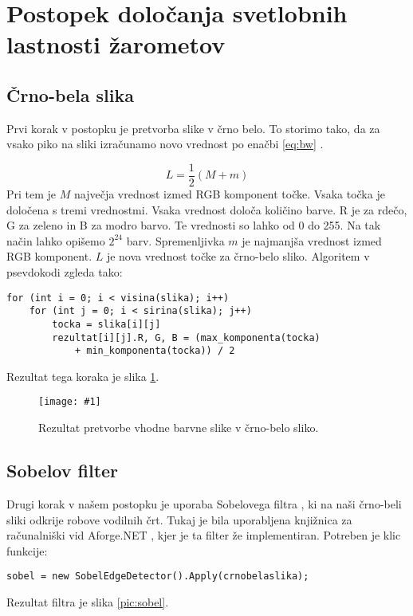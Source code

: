\documentclass[oneside, a4paper, 12pt]{book}
\newcommand{\slika}[3]{
	\begin{figure}
	\begin{center}
	\texttt{[image: \#1]}
	\end{center}
	\vspace{-20pt}
	\caption{#2}
	\label{#3}
	\end{figure}
}
\begin{document}
\section{Postopek določanja svetlobnih lastnosti žarometov}
\subsection{Črno-bela slika}
Prvi korak v postopku je pretvorba slike v črno belo. To storimo tako, da za vsako piko na sliki izračunamo novo vrednost po enačbi \ref{eq:bw} \cite{LHS}.

\begin{equation}
L=\dfrac{1}{2}(M+m)
\label{eq:bw}
\end{equation}
Pri tem je $M$ največja vrednost izmed RGB \cite{RGB} komponent točke. Vsaka točka je določena s tremi vrednostmi. Vsaka vrednost določa količino barve. R je za rdečo, G za zeleno in B za modro barvo. Te vrednosti so lahko od 0 do 255. Na tak način lahko opišemo $2^{24}$ barv. Spremenljivka $m$ je najmanjša vrednost izmed RGB komponent. $L$ je nova vrednost točke za črno-belo sliko. Algoritem v psevdokodi zgleda tako:
\begin{samepage}
\begin{verbatim}
for (int i = 0; i < visina(slika); i++)
    for (int j = 0; i < sirina(slika); j++)
	    tocka = slika[i][j]
	    rezultat[i][j].R, G, B = (max_komponenta(tocka) 
	        + min_komponenta(tocka)) / 2
\end{verbatim}
\end{samepage}
Rezultat tega koraka je slika \ref{pic:bw}.



\slika{slike/crno-bela-slika.jpg}{Rezultat pretvorbe vhodne barvne slike v črno-belo sliko.}{pic:bw}

\subsection{Sobelov filter}
\label{ch:sobel}
Drugi korak v našem postopku je uporaba Sobelovega filtra \cite{sobel-wiki}, ki na naši črno-beli sliki odkrije robove vodilnih črt. Tukaj je bila uporabljena knjižnica za računalniški vid Aforge.NET \cite{sobel}, kjer je ta filter že implementiran. Potreben je klic funkcije:
\begin{samepage}
\begin{verbatim}
sobel = new SobelEdgeDetector().Apply(crnobelaslika);
\end{verbatim}
\end{samepage}
Rezultat filtra je slika \ref{pic:sobel}.
\end{document}
